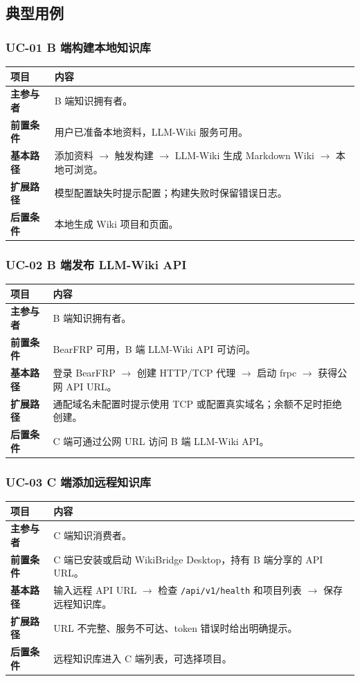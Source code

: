 \documentclass[UTF8,a4paper,12pt,fontset=fandol]{ctexart}
\newcommand{\code}[1]{\begingroup\urlstyle{tt}\footnotesize\nolinkurl{#1}\endgroup}
\begin{document}
\subsection{典型用例}
\subsubsection{UC-01 B 端构建本地知识库}
\begin{longtable}{>{\bfseries}p{3.0cm}p{11.2cm}}
\toprule
项目 & 内容 \\
\midrule
主参与者 & B 端知识拥有者。 \\
前置条件 & 用户已准备本地资料，LLM-Wiki 服务可用。 \\
基本路径 & 添加资料 $\rightarrow$ 触发构建 $\rightarrow$ LLM-Wiki 生成 Markdown Wiki $\rightarrow$ 本地可浏览。 \\
扩展路径 & 模型配置缺失时提示配置；构建失败时保留错误日志。 \\
后置条件 & 本地生成 Wiki 项目和页面。 \\
\bottomrule
\end{longtable}

\subsubsection{UC-02 B 端发布 LLM-Wiki API}
\begin{longtable}{>{\bfseries}p{3.0cm}p{11.2cm}}
\toprule
项目 & 内容 \\
\midrule
主参与者 & B 端知识拥有者。 \\
前置条件 & BearFRP 可用，B 端 LLM-Wiki API 可访问。 \\
基本路径 & 登录 BearFRP $\rightarrow$ 创建 HTTP/TCP 代理 $\rightarrow$ 启动 frpc $\rightarrow$ 获得公网 API URL。 \\
扩展路径 & 通配域名未配置时提示使用 TCP 或配置真实域名；余额不足时拒绝创建。 \\
后置条件 & C 端可通过公网 URL 访问 B 端 LLM-Wiki API。 \\
\bottomrule
\end{longtable}

\subsubsection{UC-03 C 端添加远程知识库}
\begin{longtable}{>{\bfseries}p{3.0cm}p{11.2cm}}
\toprule
项目 & 内容 \\
\midrule
主参与者 & C 端知识消费者。 \\
前置条件 & C 端已安装或启动 WikiBridge Desktop，持有 B 端分享的 API URL。 \\
基本路径 & 输入远程 API URL $\rightarrow$ 检查 \code{/api/v1/health} 和项目列表 $\rightarrow$ 保存远程知识库。 \\
扩展路径 & URL 不完整、服务不可达、token 错误时给出明确提示。 \\
后置条件 & 远程知识库进入 C 端列表，可选择项目。 \\
\bottomrule
\end{longtable}
\end{document}
